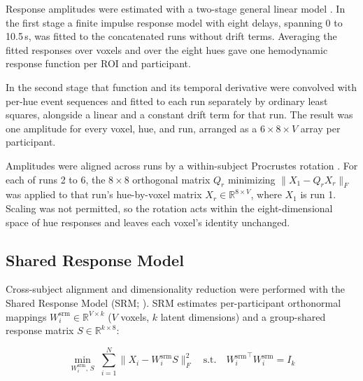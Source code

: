 Response amplitudes were estimated with a two-stage general linear model \parencite{dale1999, brouwer2009, brouwer2013}. In the first stage a finite impulse response model with eight delays, spanning 0 to 10.5\,s, was fitted to the concatenated runs without drift terms. Averaging the fitted responses over voxels and over the eight hues gave one hemodynamic response function per ROI and participant.

In the second stage that function and its temporal derivative were convolved with per-hue event sequences and fitted to each run separately by ordinary least squares, alongside a linear and a constant drift term for that run. The result was one amplitude for every voxel, hue, and run, arranged as a $6 \times 8 \times V$ array per participant.

Amplitudes were aligned across runs by a within-subject Procrustes rotation \parencite{gower1975}. For each of runs 2 to 6, the $8 \times 8$ orthogonal matrix $Q_r$ minimizing $\|X_1 - Q_r X_r\|_F$ was applied to that run's hue-by-voxel matrix $X_r \in \mathbb{R}^{8 \times V}$, where $X_1$ is run 1. Scaling was not permitted, so the rotation acts within the eight-dimensional space of hue responses and leaves each voxel's identity unchanged.

\subsection{Shared Response Model}
\label{sec:methods:srm}

Cross-subject alignment and dimensionality reduction were performed with the Shared Response Model (SRM; \citealp{chen2015}). SRM estimates per-participant orthonormal mappings $W^{\mathrm{srm}}_i \in \mathbb{R}^{V \times k}$ ($V$ voxels, $k$ latent dimensions) and a group-shared response matrix $S \in \mathbb{R}^{k \times 8}$:

\begin{equation}
  \min_{W^{\mathrm{srm}}_i,\,S}\;\sum_{i=1}^N \|X_i - W^{\mathrm{srm}}_i S\|_F^2 \quad\text{s.t.}\quad {W^{\mathrm{srm}}_i}^\top W^{\mathrm{srm}}_i = I_k
\end{equation}

